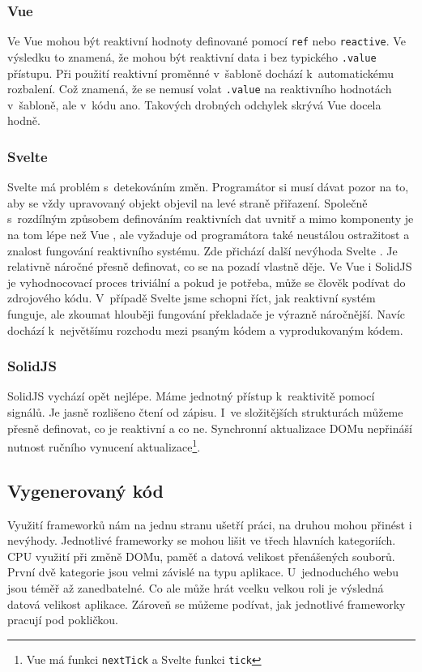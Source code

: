 \documentclass[
  master,
  program=ainf,
  tables=false,
  sourcecodes,
  glossaries,
  index
]{kidiplom}
\begin{document}
\subsubsection{Vue}
Ve Vue \cite{vue} mohou být reaktivní hodnoty definované pomocí {\tt ref} nebo {\tt reactive}. Ve výsledku to znamená, že mohou být 
reaktivní data i bez typického {\tt .value} přístupu. Při použití reaktivní proměnné v~šabloně dochází k~automatickému
rozbalení. Což znamená, že se nemusí volat {\tt .value} na reaktivního hodnotách v~šabloně, ale v~kódu ano. Takových 
drobných odchylek skrývá Vue \cite{vue} docela hodně.

\subsubsection{Svelte}
Svelte \cite{svelte} má problém s~detekováním změn. Programátor si musí dávat pozor na to, aby se vždy upravovaný objekt
objevil na levé straně přiřazení. Společně s~rozdílným způsobem definováním reaktivních dat uvnitř a mimo komponenty
je na tom lépe než Vue \cite{vue}, ale vyžaduje od programátora také neustálou ostražitost a znalost fungování reaktivního 
systému. Zde přichází další nevýhoda Svelte \cite{svelte}. Je relativně náročné přesně definovat, co se na pozadí vlastně děje.
Ve Vue \cite{vue} i SolidJS \cite{solidjs} je vyhodnocovací proces triviální a pokud je potřeba, může se člověk podívat do zdrojového kódu.
V~případě Svelte \cite{svelte} jsme schopni říct, jak reaktivní systém funguje, ale zkoumat hlouběji fungování překladače je
výrazně náročnější. Navíc dochází k~největšímu rozchodu mezi psaným kódem a vyprodukovaným kódem.

\subsubsection{SolidJS}
SolidJS \cite{solidjs} vychází opět nejlépe. Máme jednotný přístup k~reaktivitě pomocí signálů. Je jasně rozlišeno čtení od zápisu.
I~ve složitějších strukturách můžeme přesně definovat, co je reaktivní a co ne. Synchronní aktualizace DOMu nepřináší
nutnost ručního vynucení aktualizace\footnote{Vue má funkci {\tt nextTick} a Svelte funkci {\tt tick}}.

\subsection{Vygenerovaný kód}

Využití frameworků nám na jednu stranu ušetří práci, na druhou mohou přinést i nevýhody.
Jednotlivé frameworky se mohou lišit ve třech hlavních kategoriích. CPU využití při změně DOMu,
paměť a datová velikost přenášených souborů. První dvě kategorie jsou velmi závislé na typu aplikace.
U~jednoduchého webu jsou téměř až zanedbatelné. Co ale může hrát vcelku velkou roli je výsledná
datová velikost aplikace. Zároveň se můžeme podívat, jak jednotlivé frameworky pracují pod pokličkou. 
\end{document}
